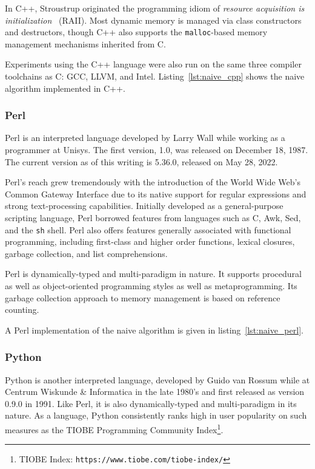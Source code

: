 In C++, Stroustrup originated the programming idiom of \textit{resource acquisition is initialization}~\cite{cpp} (RAII). Most dynamic memory is managed via class constructors and destructors, though C++ also supports the \texttt{malloc}-based memory management mechanisms inherited from C.

Experiments using the C++ language were also run on the same three compiler toolchains as C: GCC, LLVM, and Intel. Listing~\ref{lst:naive_cpp} shows the naive algorithm implemented in C++.



\subsubsection{Perl}

Perl is an interpreted language developed by Larry Wall while working as a programmer at Unisys. The first version, 1.0, was released on December 18, 1987. The current version as of this writing is 5.36.0, released on May 28, 2022.

Perl's reach grew tremendously with the introduction of the World Wide Web's Common Gateway Interface due to its native support for regular expressions and strong text-processing capabilities. Initially developed as a general-purpose scripting language, Perl borrowed features from languages such as C, Awk, Sed, and the \texttt{sh} shell. Perl also offers features generally associated with functional programming, including first-class and higher order functions, lexical closures, garbage collection, and list comprehensions.

Perl is dynamically-typed and multi-paradigm in nature. It supports procedural as well as object-oriented programming styles as well as metaprogramming. Its garbage collection approach to memory management is based on reference counting.

A Perl implementation of the naive algorithm is given in listing~\ref{lst:naive_perl}.



\subsubsection{Python}

Python is another interpreted language, developed by Guido van Rossum while at Centrum Wiskunde \& Informatica in the late 1980's and first released as version 0.9.0 in 1991. Like Perl, it is also dynamically-typed and multi-paradigm in its nature. As a language, Python consistently ranks high in user popularity on such measures as the TIOBE Programming Community Index\footnote{TIOBE Index: \texttt{https://www.tiobe.com/tiobe-index/}}.

